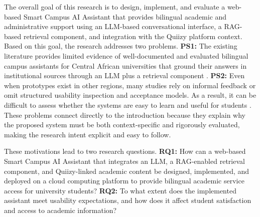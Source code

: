 \documentclass[a4paper,9pt,twocolumn]{extarticle}
\begin{document}
The overall goal of this research is to design, implement, and evaluate
a web-based Smart Campus AI Assistant that provides bilingual academic
and administrative support using an LLM-based conversational interface,
a RAG-based retrieval component, and integration with the Quiizy
platform context. Based on this goal, the research addresses two
problems. \textbf{PS1:} The existing literature provides limited evidence
of well-documented and evaluated bilingual campus assistants for Central
African universities that ground their answers in institutional sources
through an LLM plus a retrieval component
\cite{labadze2023,pereira2023,lewis2020retrieval,gao2023retrieval}.
\textbf{PS2:} Even when prototypes exist in other regions, many studies
rely on informal feedback or omit structured usability inspection and
acceptance models. As a result, it can be difficult to assess whether
the systems are easy to learn and useful for students
\cite{hollingsed2007,mahatody2010,davis1989,venkatesh2003,delone2003}.
These problems connect directly to the introduction because they explain
why the proposed system must be both context-specific and rigorously
evaluated, making the research intent explicit and easy to follow.

These motivations lead to two research questions. \textbf{RQ1:} How can a
web-based Smart Campus AI Assistant that integrates an LLM, a
RAG-enabled retrieval component, and Quiizy-linked academic content be
designed, implemented, and deployed on a cloud computing platform to
provide bilingual academic service access for university students?
\textbf{RQ2:} To what extent does the implemented assistant meet usability
expectations, and how does it affect student satisfaction and access to
academic information?
\end{document}
